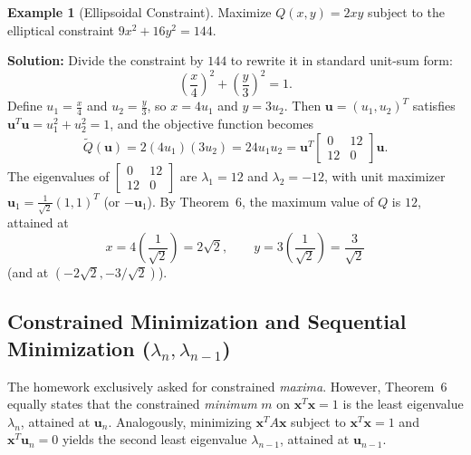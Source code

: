 \documentclass[11pt, letterpaper]{article}
\theoremstyle{definition}
\newtheorem{example}{Example}[section]
\theoremstyle{remark}
\begin{document}
\begin{example}[Ellipsoidal Constraint]
Maximize $Q(x, y) = 2xy$ subject to the elliptical constraint $9x^2 + 16y^2 = 144$.

\textbf{Solution:} Divide the constraint by $144$ to rewrite it in standard unit-sum form:
\[
\left(\frac{x}{4}\right)^2 + \left(\frac{y}{3}\right)^2 = 1.
\]
Define $u_1 = \frac{x}{4}$ and $u_2 = \frac{y}{3}$, so $x = 4u_1$ and $y = 3u_2$. Then $\mathbf{u} = (u_1, u_2)^T$ satisfies $\mathbf{u}^T \mathbf{u} = u_1^2 + u_2^2 = 1$, and the objective function becomes
\[
\tilde{Q}(\mathbf{u}) = 2(4u_1)(3u_2) = 24u_1 u_2 = \mathbf{u}^T \begin{bmatrix} 0 & 12 \\ 12 & 0 \end{bmatrix} \mathbf{u}.
\]
The eigenvalues of $\begin{bmatrix} 0 & 12 \\ 12 & 0 \end{bmatrix}$ are $\lambda_1 = 12$ and $\lambda_2 = -12$, with unit maximizer $\mathbf{u}_1 = \frac{1}{\sqrt{2}}(1, 1)^T$ (or $-\mathbf{u}_1$). By Theorem~6, the maximum value of $Q$ is $12$, attained at
\[
x = 4\left(\frac{1}{\sqrt{2}}\right) = 2\sqrt{2}, \qquad y = 3\left(\frac{1}{\sqrt{2}}\right) = \frac{3}{\sqrt{2}}
\]
(and at $(-2\sqrt{2}, -3/\sqrt{2})$).
\end{example}

\subsection{Constrained Minimization and Sequential Minimization ($\lambda_n, \lambda_{n-1}$)}
The homework exclusively asked for constrained \emph{maxima}. However, Theorem~6 equally states that the constrained \emph{minimum} $m$ on $\mathbf{x}^T \mathbf{x} = 1$ is the least eigenvalue $\lambda_n$, attained at $\mathbf{u}_n$. Analogously, minimizing $\mathbf{x}^T A \mathbf{x}$ subject to $\mathbf{x}^T \mathbf{x} = 1$ and $\mathbf{x}^T \mathbf{u}_n = 0$ yields the second least eigenvalue $\lambda_{n-1}$, attained at $\mathbf{u}_{n-1}$.
\end{document}
